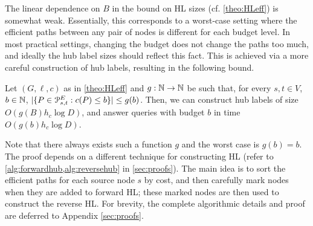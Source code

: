 The linear dependence on $B$ in the bound on HL sizes (cf. \cref{theo:HLeff}) is somewhat weak. 
Essentially, this corresponds to a worst-case setting where the efficient paths between any pair of nodes is different for each budget level. 
In most practical settings, changing the budget does not change the paths too much, and ideally the hub label sizes should reflect this fact. 
This is achieved via a more careful construction of hub labels, resulting in the following bound. 
\begin{theorem}\label{thm:markedhubs}
Let $(G,\ell,c)$ as in \cref{theo:HLeff} and $g:\mathbb{N}\to \mathbb{N}$ be such that, for every $s,t\in V$, $b\in \mathbb{N}$, $\lvert\{P\in\mathcal{P}_{s,t}^E: c(P)\leq b\}\rvert \leq g(b)$.
Then, we can construct hub labels of size $O(g(B)h_c\log D)$, and answer queries with budget $b$ in time $O(g(b)h_c\log D)$.
\end{theorem}

Note that there always exists such a function $g$ and the worst case is $g(b)=b$.
The proof depends on a different technique for constructing HL (refer to \cref{alg:forwardhub,alg:reversehub} in \cref{sec:proofs}). The main idea is to sort the efficient paths for each source node $s$ by cost, and then carefully mark nodes when they are added to forward HL; these marked nodes are then used to construct the reverse HL.
For brevity, the complete algorithmic details and proof are deferred to Appendix \ref{sec:proofs}.